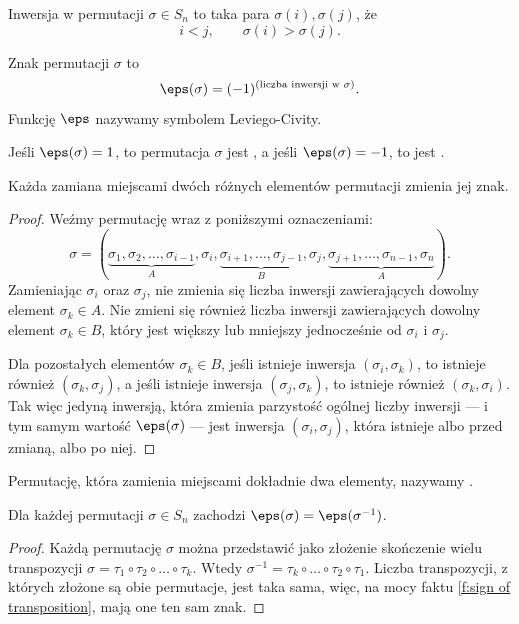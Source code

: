 \begin{definition}
    Inwersja w permutacji $\sigma \in S_n$ to taka para $\sigma(i), \sigma(j)$, że
    \[ i < j, \qquad \sigma(i) > \sigma(j). \]
\end{definition}

\begin{definition}
    Znak permutacji $\sigma$ to
    \[ \eps(\sigma) = (-1)^{(\text{liczba inwersji w } \sigma)}. \]
    Funkcję $\eps$ nazywamy symbolem Leviego-Civity.
\end{definition}

Jeśli $\eps(\sigma) = 1$, to permutacja $\sigma$ jest , a jeśli  $\eps(\sigma) = -1$, to jest .

\begin{fact}
    \label{f:sign of transposition}
    Każda zamiana miejscami dwóch różnych elementów permutacji zmienia jej znak.
\end{fact}
\begin{proof}
    Weźmy permutację wraz z poniższymi oznaczeniami:
    \[ \sigma = (\underbrace{\sigma_1, \sigma_2, \ldots, \sigma_{i-1}}_A, \sigma_i, \underbrace{\sigma_{i+1}, \ldots, \sigma_{j-1}}_B, \sigma_j, \underbrace{\sigma_{j+1}, \ldots, \sigma_{n-1}, \sigma_n}_A). \]
    Zamieniając $\sigma_i$ oraz $\sigma_j$, nie zmienia się liczba inwersji zawierających dowolny element $\sigma_k \in A$. Nie zmieni się również liczba inwersji zawierających dowolny element $\sigma_k \in B$, który jest większy lub mniejszy jednocześnie od $\sigma_i$ i $\sigma_j$.

    Dla pozostałych elementów $\sigma_k \in B$, jeśli istnieje inwersja $(\sigma_i, \sigma_k)$, to istnieje również $(\sigma_k, \sigma_j)$, a jeśli istnieje inwersja $(\sigma_j, \sigma_k)$, to istnieje również $(\sigma_k, \sigma_i)$. Tak więc jedyną inwersją, która zmienia parzystość ogólnej liczby inwersji --- i tym samym wartość $\eps(\sigma)$ --- jest inwersja $(\sigma_i, \sigma_j)$, która istnieje albo przed zmianą, albo po niej.
\end{proof}

Permutację, która zamienia miejscami dokładnie dwa elementy, nazywamy .

\begin{fact}
    \label{f:sign of inverse}
    Dla każdej permutacji $\sigma \in S_n$ zachodzi $\eps(\sigma) = \eps(\sigma^{-1})$.
\end{fact}
\begin{proof}
    Każdą permutację $\sigma$ można przedstawić jako złożenie skończenie wielu transpozycji $\sigma = \tau_1 \circ \tau_2 \circ \ldots \circ \tau_k$. Wtedy $\sigma^{-1} = \tau_k \circ \ldots \circ \tau_2 \circ \tau_1$. Liczba transpozycji, z których złożone są obie permutacje, jest taka sama, więc, na mocy faktu \ref{f:sign of transposition}, mają one ten sam znak.
\end{proof}

